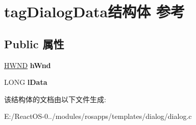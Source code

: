 \hypertarget{structtag_dialog_data}{}\section{tag\+Dialog\+Data结构体 参考}
\label{structtag_dialog_data}
\subsection*{Public 属性}
\begin{DoxyCompactItemize}
\item 
\mbox{\label{structtag_dialog_data_a447b319d3ce046200e3d2868aa34c5b6}} 
\hyperlink{interfacevoid}{H\+W\+ND} {\bfseries h\+Wnd}
\item 
\mbox{\label{structtag_dialog_data_ae217c59696dce0373db688ac2c784026}} 
L\+O\+NG {\bfseries l\+Data}
\end{DoxyCompactItemize}


该结构体的文档由以下文件生成\+:\begin{DoxyCompactItemize}
\item 
E\+:/\+React\+O\+S-\/0../modules/rosapps/templates/dialog/dialog.\+c\end{DoxyCompactItemize}
